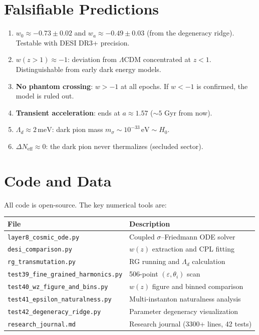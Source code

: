 \documentclass[11pt,a4paper]{article}
\newcommand{\Ld}{\Lambda_d}
\newcommand{\meV}{\,\mathrm{meV}}
\begin{document}
\section{Falsifiable Predictions}
\label{sec:predictions}

\begin{enumerate}
  \item \textbf{$w_0 \approx -0.73 \pm 0.02$} and \textbf{$w_a \approx -0.49 \pm 0.03$}
    (from the degeneracy ridge).
    Testable with DESI DR3+ precision.
  \item \textbf{$w(z>1) \approx -1$}: deviation from $\Lambda$CDM concentrated at $z < 1$.
    Distinguishable from early dark energy models.
  \item \textbf{No phantom crossing}: $w > -1$ at all epochs.
    If $w < -1$ is confirmed, the model is ruled out.
  \item \textbf{Transient acceleration}: ends at $a\approx 1.57$ ($\sim 5$ Gyr from now).
  \item \textbf{$\Ld \approx 2\meV$}: dark pion mass $m_\sigma \sim 10^{-33}\,\mathrm{eV}\sim H_0$.
  \item \textbf{$\Delta N_\mathrm{eff} \approx 0$}: the dark pion never thermalizes (secluded sector).
\end{enumerate}

\section{Code and Data}
\label{sec:code}

All code is open-source. The key numerical tools are:

\begin{table}[H]
\centering
\begin{tabular}{@{}ll@{}}
\toprule
\textbf{File} & \textbf{Description} \\
\midrule
\texttt{layer8\_cosmic\_ode.py} & Coupled $\sigma$--Friedmann ODE solver \\
\texttt{desi\_comparison.py} & $w(z)$ extraction and CPL fitting \\
\texttt{rg\_transmutation.py} & RG running and $\Ld$ calculation \\
\texttt{test39\_fine\_grained\_harmonics.py} & 506-point $(\varepsilon,\theta_i)$ scan \\
\texttt{test40\_wz\_figure\_and\_bins.py} & $w(z)$ figure and binned comparison \\
\texttt{test41\_epsilon\_naturalness.py} & Multi-instanton naturalness analysis \\
\texttt{test42\_degeneracy\_ridge.py} & Parameter degeneracy visualization \\
\texttt{research\_journal.md} & Research journal (3300+ lines, 42 tests) \\
\bottomrule
\end{tabular}
\end{table}
\end{document}
